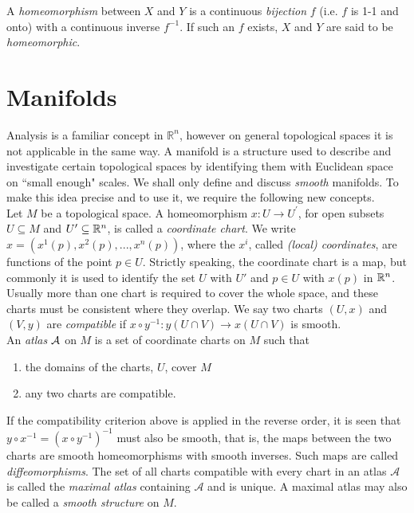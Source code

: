 A \textit{homeomorphism} between $X$ and $Y$ is a continuous \textit{bijection}
$f$ (i.e. $f$ is 1-1 and onto) with a continuous inverse $f^{-1}$. If such an
$f$ exists, $X$ and $Y$ are said to be \textit{homeomorphic}.\\ 

\pagebreak
\section{Manifolds}\label{sec:Manifolds}
Analysis is a familiar concept in $\mathbb{R}^n$, however on general topological
spaces it is not applicable in the same way. A manifold is a structure used to
describe and investigate certain topological spaces by identifying them with
Euclidean space on ``small enough" scales. We shall only define and discuss {\em
smooth} manifolds. To make this idea precise and to use it, we require the
following new concepts.\\

Let $M$ be a topological space. A homeomorphism $x:U\rightarrow U^\prime$, for
open subsets $U\subseteq M$ and $U^\prime\subseteq {\mathbb R}^n$, is called a
\textit{coordinate chart}. We write $x=\left(x^1(p),x^2(p),...,x^n(p)\right)$,
where the $x^i$, called \textit{(local) coordinates}, are functions of the point
$p\in U$. Strictly speaking, the coordinate chart is a map, but commonly it
is used to identify the set $U$ with $U'$ and $p\in U$ with $x(p)$ in ${\mathbb R}^n$.\\

Usually more than one chart is required to cover the whole space, and these
charts must be consistent where they overlap. We say two charts $(U, x)$ and
$(V, y)$ are \textit{compatible} if $x \circ y^{-1} : y(U\cap V) \rightarrow x(U\cap V)$
is smooth. \\

An \textit{atlas} $\cal A$ on $M$ is a set of coordinate charts on $M$ such
that 
\begin{enumerate}
\item the domains of the charts, $U$, cover $M$
\item any two charts are compatible.
\end{enumerate}
If the compatibility criterion above is applied in the reverse order, it is seen
that $y \circ x^{-1} = (x \circ y^{-1})^{-1}$ must also be smooth, that is, the
maps between the two charts are smooth homeomorphisms with smooth inverses. Such
maps are called \textit{diffeomorphisms}. The set of all charts compatible with
every chart in an atlas $\mathcal{A}$ is called the \textit{maximal atlas}
containing $\mathcal{A}$ and is unique. A maximal atlas may also be called a
\textit{smooth structure} on $M$.\\


